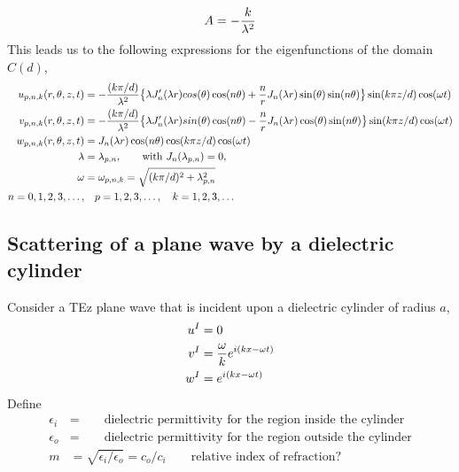 \documentclass[10pt]{article}
\begin{document}
\[
     A = - { k \over \lambda^2}
\]
This leads us to the following expressions for the eigenfunctions of the domain $C(d)$,
\begin{align*}
  u_{p,n,k}(r,\theta,z,t) &= - { (k\pi/d) \over \lambda^2 }
       \big\{ 
           \lambda J_n'(\lambda r ) cos(\theta)\cos(n \theta) 
                        + {n\over r} J_n(\lambda r ) \sin(\theta) \sin(n \theta)  \big\} 
               \sin(k \pi z/d)  \cos(\omega t)  \\
  v_{p,n,k}(r,\theta,z,t) &=   -{ (k\pi/d) \over \lambda^2} 
      \big\{ \lambda J_n'(\lambda r) sin(\theta)\cos(n \theta)
                 - {n\over r} J_n(\lambda r ) \cos(\theta) \sin(n \theta)  \big\}  
                          \sin(k \pi z/d)  \cos(\omega t) \\
  w_{p,n,k}(r,\theta,z,t) & = J_n( \lambda r ) \cos(n \theta) \cos(k \pi z/d) \cos(\omega t) \\
       \lambda &= \lambda_{p,n}, \qquad \mbox{with $J_n(\lambda_{p,n})=0$,} \\
       \omega &= \omega_{p,n,k} = \sqrt{(k\pi/d)^2 + \lambda_{p,n}^2} \\
        n=0,1,2,3,\ldots,&\quad p=1,2,3,\ldots,\quad k=1,2,3,\ldots
\end{align*}


\clearpage
\subsection{Scattering of a plane wave by a dielectric cylinder}


Consider a TEz plane wave that is incident upon a dielectric cylinder of radius $a$,
\begin{align*}
    u^I &= 0 \\
    v^I &= {\omega \over k} e^{i(k x - \omega t)} \\
    w^I &= e^{i(k x - \omega t)}
\end{align*}
Define
\begin{align*}
    \epsilon_i &= \qquad\mbox{dielectric permittivity for the region inside the cylinder} \\
    \epsilon_o &= \qquad\mbox{dielectric permittivity for the region outside the cylinder}  \\
    m & =\sqrt{\epsilon_i/\epsilon_o} = c_o/c_i  \qquad\mbox{relative index of refraction?} 
\end{align*}

\newcommand{\Jn}{J_n}
\newcommand{\Yn}{Y_n}
\newcommand{\Hn}{H_n}
\end{document}
